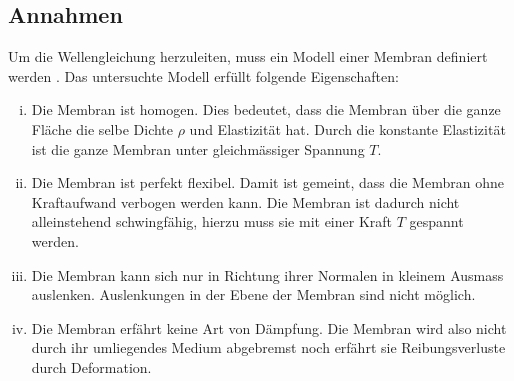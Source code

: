 \subsection{Annahmen} \label{kreimembran:annahmen}
Um die Wellengleichung herzuleiten,
muss ein Modell einer Membran definiert werden
\cite{kreismembran:wellengleichung_herleitung}. 
Das untersuchte Modell erfüllt folgende Eigenschaften:
\begin{enumerate}[i)]
	\item Die Membran ist homogen. 
	Dies bedeutet, dass die Membran über die ganze Fläche die selbe Dichte $ \rho $  und Elastizität hat. 
	Durch die konstante Elastizität ist die ganze Membran unter gleichmässiger Spannung $ T $.
	\item Die Membran ist perfekt flexibel. 
	Damit ist gemeint, dass die Membran ohne Kraftaufwand verbogen werden kann. 
	Die Membran ist dadurch nicht alleinstehend schwingfähig, hierzu muss sie mit einer Kraft $ T $ gespannt werden.
	\item Die Membran kann sich nur in Richtung ihrer Normalen in kleinem Ausmass auslenken.
	Auslenkungen in der Ebene der Membran sind nicht möglich.
	\item Die Membran erfährt keine Art von Dämpfung. 
	Die Membran wird also nicht durch ihr umliegendes Medium abgebremst noch erfährt sie Reibungsverluste durch Deformation.
	
\end{enumerate}

